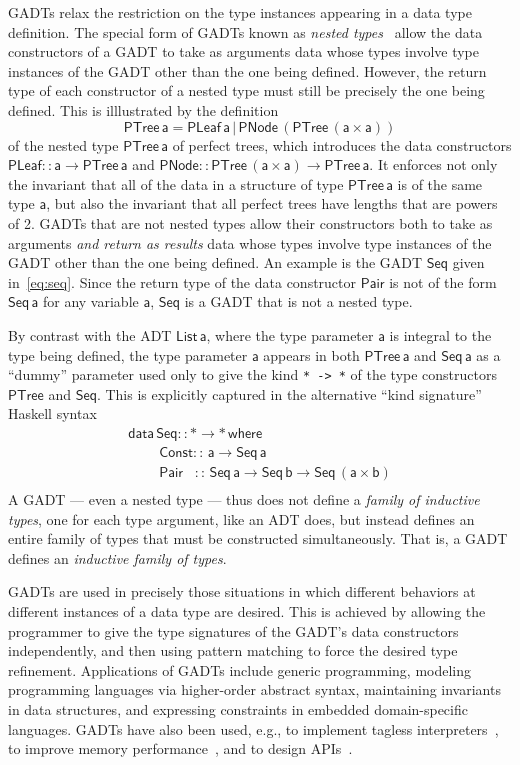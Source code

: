 \documentclass[submission,copyright,creativecommons]{eptcs}
\begin{document}
GADTs relax the restriction on the type instances appearing in a data
type definition. The special form of GADTs known as {\em nested
  types}~\cite{bm98} allow the data constructors of a GADT to take as
arguments data whose types involve type instances of the GADT other
than the one being defined. However, the return type of each
constructor of a nested type must still be precisely the one being
defined. This is illlustrated by the definition
\[\mathsf{PTree \, a = PLeaf \,a \,|\, PNode \,(PTree\,(a \times
  a))}\] of the nested type $\mathsf{PTree\,a}$ of perfect trees,
which introduces the data constructors $\mathsf{PLeaf :: a \to
  PTree\,a}$ and $\mathsf{PNode :: PTree \,(a\times a) \to
  PTree\,a}$. It enforces not only the invariant that all of the data
in a structure of type $\mathsf{PTree\,a}$ is of the same type
$\mathsf{a}$, but also the invariant that all perfect trees have
lengths that are powers of 2. GADTs that are not nested types allow
their constructors both to take as arguments {\em and return as
  results} data whose types involve type instances of the GADT other
than the one being defined. An example is the GADT $\mathsf{Seq}$
given in~\eqref{eq:seq}. Since the return type of the data constructor
$\mathsf{Pair}$ is not of the form $\mathsf{Seq\,a}$ for any variable
$\mathsf{a}$, $\mathsf{Seq}$ is a GADT that is not a nested type.

By contrast with the ADT $\mathsf{List\, a}$, where the type parameter
$\mathsf{a}$ is integral to the type being defined, the type parameter
$\mathsf{a}$ appears in both $\mathsf{PTree\,a}$ and $\mathsf{Seq\,a}$
as a ``dummy'' parameter used only to give the kind \verb|* -> *| of
the type constructors $\mathsf{PTree}$ and $\mathsf{Seq}$. This is
explicitly captured in the alternative ``kind signature'' Haskell
syntax
\[\begin{array}{l}
\mathsf{data\, Seq :: * \to *\,where}\\
\mathsf{\;\;\;\;\;\;\;\;Const ::\, a \to Seq\,a}\\
\mathsf{\;\;\;\;\;\;\;\;Pair\,\,\,\,\, ::\, Seq \,a \to Seq\,b \to
  Seq\,(a \times b)}\\ 
\end{array}\]
A GADT --- even a nested type --- thus does not define a {\em family
  of inductive types}, one for each type argument, like an ADT does,
but instead defines an entire family of types that must be constructed
simultaneously. That is, a GADT defines an {\em inductive family of
  types}.

GADTs are used in precisely those situations in which different
behaviors at different instances of a data type are desired. This is
achieved by allowing the programmer to give the type signatures of the
GADT's data constructors independently, and then using pattern
matching to force the desired type refinement. Applications of GADTs
include generic programming, modeling programming languages via
higher-order abstract syntax, maintaining invariants in data
structures, and expressing constraints in embedded domain-specific
languages. GADTs have also been used, e.g., to implement tagless
interpreters~\cite{pl04,pr06,pvww06}, to improve memory
performance~\cite{min15}, and to design APIs~\cite{pen20}.
\end{document}
